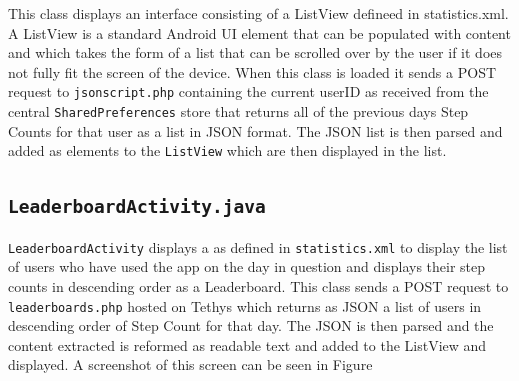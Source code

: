 \documentclass{l4proj}
\begin{document}
This class displays an interface consisting of a ListView defineed in statistics.xml. A ListView is a standard Android UI element that can be populated with content and which takes the form of a list that can be scrolled over by the user if it does not fully fit the screen of the device. When this class is loaded it sends a POST request to \texttt{jsonscript.php} containing the current userID as received from the central \texttt{SharedPreferences} store that returns all of the previous days Step Counts for that user as a list in JSON format. The JSON list is then parsed and added as elements to the \texttt{ListView} which are then displayed in the list.

\subsection{\texttt{LeaderboardActivity.java}}

\texttt{LeaderboardActivity} displays a \texttt{} as defined in \texttt{statistics.xml} to display the list of users who have used the app on the day in question and displays their step counts in descending order as a Leaderboard. This class sends a POST request to \texttt{leaderboards.php} hosted on Tethys which returns as JSON a list of users in descending order of Step Count for that day. The JSON is then parsed and the content extracted is reformed as readable text and added to the ListView and displayed. A screenshot of this screen can be seen in Figure 
\end{document}
